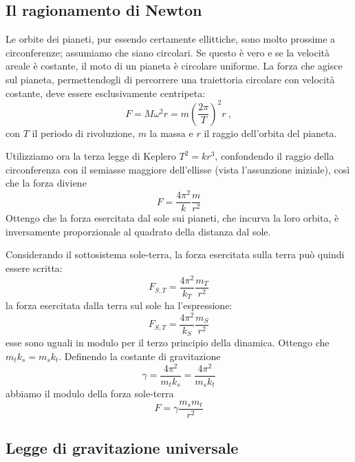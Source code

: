 \documentclass[class=book, crop=false, oneside, 12pt]{standalone}
\begin{document}
\subsection{Il ragionamento di Newton}

Le orbite dei pianeti, pur essendo certamente ellittiche, sono molto prossime a circonferenze; assumiamo che siano circolari.\newline
Se questo è vero e se la velocità areale è costante, il moto di un pianeta è circolare uniforme.
La forza che agisce sul  pianeta, permettendogli di percorrere una traiettoria circolare  con velocità costante, deve essere esclusivamente centripeta:
\begin{equation}
    F = M \omega^2 r = m \left(\frac{2 \pi}{T}\right)^2 r \ ,
\end{equation}
con \(T\) il periodo di rivoluzione, \(m\) la massa e \(r\) il raggio dell'orbita del pianeta. 

Utilizziamo ora la terza legge di Keplero \(T^2 = k r^3\), confondendo il raggio della circonferenza con il semiasse maggiore dell'ellisse (vista l'assunzione iniziale), così che la forza diviene
\begin{equation}
    F = \frac{4 \pi^2}{k} \frac{m}{r^2}
\end{equation}
Ottengo che la forza esercitata dal sole sui pianeti, che incurva la loro orbita, è inversamente proporzionale al quadrato della distanza dal sole.

Considerando il sottosistema sole-terra, la forza esercitata sulla terra può quindi essere scritta:
\begin{equation}
    F_{S,T} = \frac{4 \pi^2}{k_T} \frac{m_T}{r^2}
\end{equation}
la forza esercitata dalla terra sul sole ha l'espressione:
\begin{equation}
    F_{S,T} = \frac{4 \pi^2}{k_S} \frac{m_S}{r^2}
\end{equation}
esse sono uguali in modulo per il terzo principio della dinamica.
Ottengo che \(m_t k_s = m_s k_t\).
Definendo la costante di gravitazione
\begin{equation}
    \gamma = \frac{4 \pi^2}{m_t k_s} = \frac{4 \pi^2}{m_s k_t}
\end{equation}
abbiamo il modulo della forza sole-terra
\begin{equation}
    F = \gamma \frac{m_s m_t}{r^2}
\end{equation}

\subsection{Legge di gravitazione universale}
\end{document}
